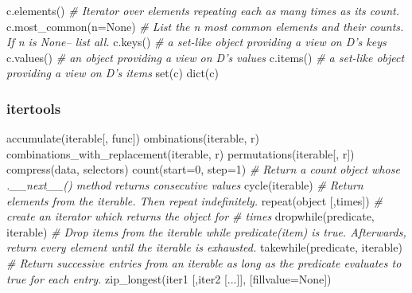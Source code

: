 \documentclass[11pt]{article}
\newenvironment{Shaded}{}{}
\newcommand{\DecValTok}[1]{\textcolor[rgb]{0.25,0.63,0.44}{{#1}}}
\newcommand{\CommentTok}[1]{\textcolor[rgb]{0.38,0.63,0.69}{\textit{{#1}}}}
\newcommand{\NormalTok}[1]{{#1}}
\newcommand{\VariableTok}[1]{\textcolor[rgb]{0.10,0.09,0.49}{{#1}}}
\newcommand{\OperatorTok}[1]{\textcolor[rgb]{0.40,0.40,0.40}{{#1}}}
\newcommand{\BuiltInTok}[1]{{#1}}
\begin{document}
\begin{Shaded}
\begin{Highlighting}[]
\NormalTok{c.elements() }\CommentTok{# Iterator over elements repeating each as many times as its count.}
\NormalTok{c.most_common(n}\OperatorTok{=}\VariableTok{None}\NormalTok{) }\CommentTok{# List the n most common elements and their counts.  If n is None-- list all.}
\NormalTok{c.keys() }\CommentTok{# a set-like object providing a view on D's keys}
\NormalTok{c.values() }\CommentTok{# an object providing a view on D's values}
\NormalTok{c.items() }\CommentTok{# a set-like object providing a view on D's items}
\BuiltInTok{set}\NormalTok{(c)}
\BuiltInTok{dict}\NormalTok{(c)}
\end{Highlighting}
\end{Shaded}

\subsubsection{itertools}\label{itertools}

\begin{Shaded}
\begin{Highlighting}[]
\NormalTok{accumulate(iterable[, func])}
\NormalTok{ombinations(iterable, r)}
\NormalTok{combinations_with_replacement(iterable, r)}
\NormalTok{permutations(iterable[, r])}
\NormalTok{compress(data, selectors)}
\NormalTok{count(start}\OperatorTok{=}\DecValTok{0}\NormalTok{, step}\OperatorTok{=}\DecValTok{1}\NormalTok{) }\CommentTok{# Return a count object whose .__next__() method returns consecutive values}
\NormalTok{cycle(iterable) }\CommentTok{# Return elements from the iterable. Then repeat indefinitely.}
\NormalTok{repeat(}\BuiltInTok{object}\NormalTok{ [,times]) }\CommentTok{# create an iterator which returns the object for # times}
\NormalTok{dropwhile(predicate, iterable) }\CommentTok{# Drop items from the iterable while predicate(item) is true. Afterwards, return every element until the iterable is exhausted.}
\NormalTok{takewhile(predicate, iterable) }\CommentTok{# Return successive entries from an iterable as long as the predicate evaluates to true for each entry.}
\NormalTok{zip_longest(iter1 [,iter2 [...]], [fillvalue}\OperatorTok{=}\VariableTok{None}\NormalTok{])}
\end{Highlighting}
\end{Shaded}


    
    
    
    
\end{document}
